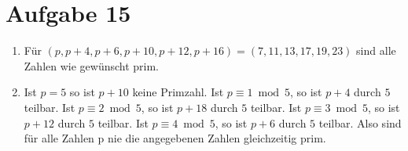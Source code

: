 \section*{Aufgabe 15}
\begin{enumerate}[(1)]
\item Für $(p, p+4, p+6, p+10, p+12, p+16) = (7, 11, 13, 17, 19, 23)$ sind alle Zahlen wie gewünscht prim.
\item Ist $p = 5$ so ist $p+10$ keine Primzahl. Ist $p \equiv 1 \bmod 5$, so ist $p+4$ durch $5$ teilbar. Ist $p \equiv 2 \bmod 5$, so ist $p+18$ durch $5$ teilbar. Ist $p \equiv 3 \bmod 5$, so ist $p+12$ durch $5$ teilbar. Ist $p \equiv 4 \bmod 5$, so ist $p+6$ durch $5$ teilbar. Also sind für alle Zahlen p nie die angegebenen Zahlen gleichzeitig prim.
\end{enumerate}
